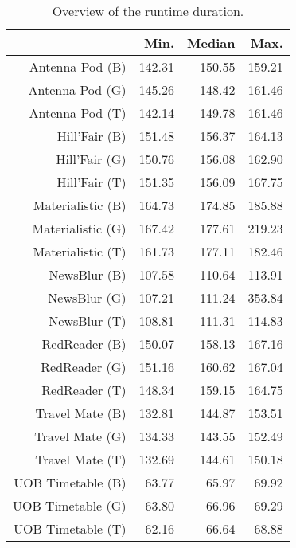 \begin{table}[ht]
\centering
\begin{tabular}{rrrr}
  \hline
 & Min. & Median & Max. \\ 
  \hline
Antenna Pod (B) & 142.31 & 150.55 & 159.21 \\ 
  Antenna Pod (G) & 145.26 & 148.42 & 161.46 \\ 
  Antenna Pod (T) & 142.14 & 149.78 & 161.46 \\ 
  Hill'Fair (B) & 151.48 & 156.37 & 164.13 \\ 
  Hill'Fair (G) & 150.76 & 156.08 & 162.90 \\ 
  Hill'Fair (T) & 151.35 & 156.09 & 167.75 \\ 
  Materialistic (B) & 164.73 & 174.85 & 185.88 \\ 
  Materialistic (G) & 167.42 & 177.61 & 219.23 \\ 
  Materialistic (T) & 161.73 & 177.11 & 182.46 \\ 
  NewsBlur (B) & 107.58 & 110.64 & 113.91 \\ 
  NewsBlur (G) & 107.21 & 111.24 & 353.84 \\ 
  NewsBlur (T) & 108.81 & 111.31 & 114.83 \\ 
  RedReader (B) & 150.07 & 158.13 & 167.16 \\ 
  RedReader (G) & 151.16 & 160.62 & 167.04 \\ 
  RedReader (T) & 148.34 & 159.15 & 164.75 \\ 
  Travel Mate (B) & 132.81 & 144.87 & 153.51 \\ 
  Travel Mate (G) & 134.33 & 143.55 & 152.49 \\ 
  Travel Mate (T) & 132.69 & 144.61 & 150.18 \\ 
  UOB Timetable (B) & 63.77 & 65.97 & 69.92 \\ 
  UOB Timetable (G) & 63.80 & 66.96 & 69.29 \\ 
  UOB Timetable (T) & 62.16 & 66.64 & 68.88 \\ 
   \hline
\end{tabular}
\caption{Overview of the runtime duration.} 
\label{tab:results:rq1:summary:duration}
\end{table}
